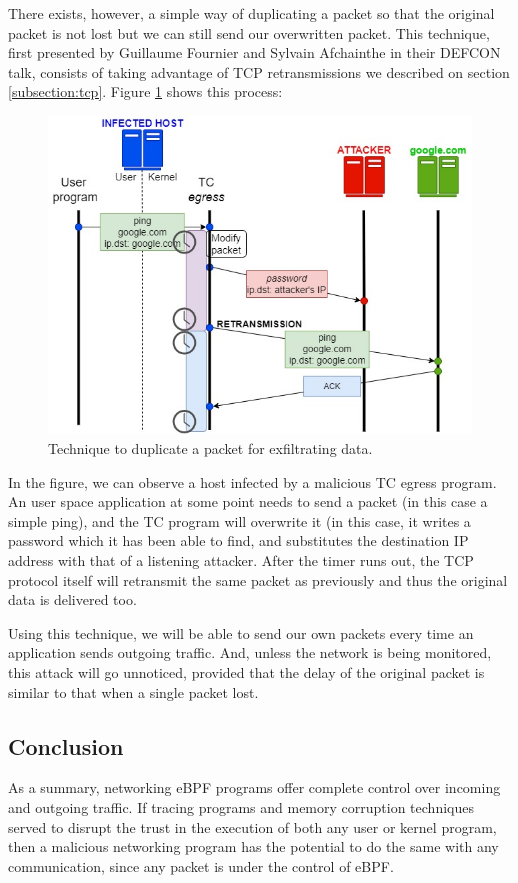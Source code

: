 \documentclass[12pt]{report} %
\begin{document}
There exists, however, a simple way of duplicating a packet so that the original packet is not lost but we can still send our overwritten packet. This technique, first presented by Guillaume Fournier and Sylvain Afchainthe in their DEFCON talk, consists of taking advantage of TCP retransmissions we described on section \ref{subsection:tcp}. Figure \ref{fig:tcp_exfiltrate_retrans} shows this process:

\begin{figure}[H]
	\centering
	\includegraphics[width=15cm]{tcp_exfiltrate_retrans.jpg}
	\caption{Technique to duplicate a packet for exfiltrating data.}
	\label{fig:tcp_exfiltrate_retrans}
\end{figure}

In the figure, we can observe a host infected by a malicious TC egress program. An user space application at some point needs to send a packet (in this case a simple ping), and the TC program will overwrite it (in this case, it writes a password which it has been able to find, and substitutes the destination IP address with that of a listening attacker.
After the timer runs out, the TCP protocol itself will retransmit the same packet as previously and thus the original data is delivered too.

Using this technique, we will be able to send our own packets every time an application sends outgoing traffic. And, unless the network is being monitored, this attack will go unnoticed, provided that the delay of the original packet is similar to that when a single packet lost.

\subsection{Conclusion}
As a summary, networking eBPF programs offer complete control over incoming and outgoing traffic. If tracing programs and memory corruption techniques served to disrupt the trust in the execution of both any user or kernel program, then a malicious networking program has the potential to do the same with any communication, since any packet is under the control of eBPF.
\end{document}
